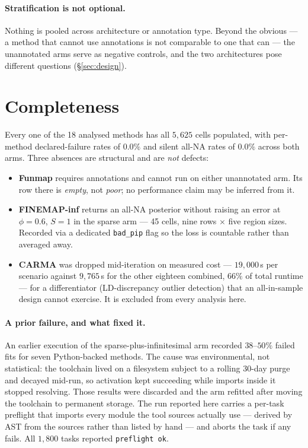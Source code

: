 \documentclass[11pt,a4paper]{article}
\begin{document}
\paragraph{Stratification is not optional.} Nothing is pooled across
architecture or annotation type. Beyond the obvious --- a method that cannot use
annotations is not comparable to one that can --- the unannotated arms serve as
negative controls, and the two architectures pose different questions
(\S\ref{sec:design}).


\section{Completeness}\label{sec:completeness}

Every one of the 18 analysed methods has all $5{,}625$ cells populated, with
per-method declared-failure rates of $0.0\%$ and silent all-NA rates of $0.0\%$
across both arms. Three absences are structural and are \emph{not} defects:

\begin{itemize}
\item \textbf{Funmap} requires annotations and cannot run on either unannotated
arm. Its row there is \emph{empty}, not \emph{poor}; no performance claim may be
inferred from it.
\item \textbf{FINEMAP-inf} returns an all-NA posterior without raising an error
at $\phi=0.6$, $S=1$ in the sparse arm --- 45 cells, nine rows $\times$ five
region sizes. Recorded via a dedicated \texttt{bad\_pip} flag so the loss is
countable rather than averaged away.
\item \textbf{CARMA} was dropped mid-iteration on measured cost --- $19{,}000$\,s
per scenario against $9{,}765$\,s for the other eighteen combined, $66\%$ of
total runtime --- for a differentiator (LD-discrepancy outlier detection) that
an all-in-sample design cannot exercise. It is excluded from every analysis here.
\end{itemize}

\paragraph{A prior failure, and what fixed it.} An earlier execution of the
sparse-plus-infinitesimal arm recorded $38$--$50\%$ failed fits for seven
Python-backed methods. The cause was environmental, not statistical: the
toolchain lived on a filesystem subject to a rolling 30-day purge and decayed
mid-run, so activation kept succeeding while imports inside it stopped
resolving. Those results were discarded and the arm refitted after moving the
toolchain to permanent storage. The run reported here carries a per-task
preflight that imports every module the tool sources actually use --- derived by
AST from the sources rather than listed by hand --- and aborts the task if any
fails. All $1{,}800$ tasks reported \texttt{preflight ok}.
\end{document}
